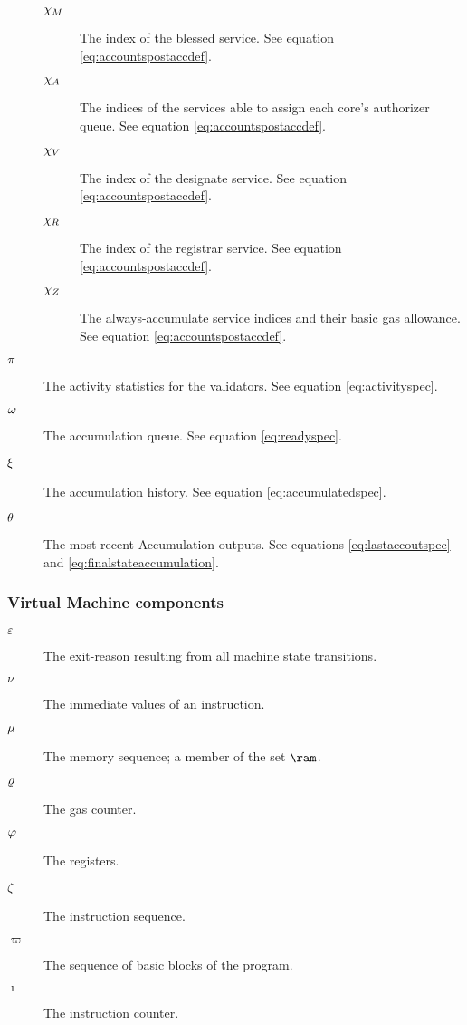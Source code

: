 \begin{description}
  \begin{description}
    \item[$\chi_M$] The index of the blessed service. See equation \ref{eq:accountspostaccdef}.
    \item[$\chi_A$] The indices of the services able to assign each core's authorizer queue. See equation \ref{eq:accountspostaccdef}.
    \item[$\chi_V$] The index of the designate service. See equation \ref{eq:accountspostaccdef}.
    \item[$\chi_R$] The index of the registrar service. See equation \ref{eq:accountspostaccdef}.
    \item[$\chi_Z$] The always-accumulate service indices and their basic gas allowance. See equation \ref{eq:accountspostaccdef}.
  \end{description}
  \item[$\pi$] The activity statistics for the validators. See equation \ref{eq:activityspec}.
  \item[$\omega$] The accumulation queue. See equation \ref{eq:readyspec}.
  \item[$\xi$] The accumulation history. See equation \ref{eq:accumulatedspec}.
  \item[$\theta$] The most recent Accumulation outputs. See equations \ref{eq:lastaccoutspec} and \ref{eq:finalstateaccumulation}.
\end{description}

\subsubsection{Virtual Machine components}

\begin{description}
  \item[$\varepsilon$] The exit-reason resulting from all machine state transitions.
  \item[$\nu$] The immediate values of an instruction.
  \item[$\mu$] The memory sequence; a member of the set $\ram$.
  \item[$\varrho$] The gas counter.
  \item[$\varphi$] The registers.
  \item[$\zeta$] The instruction sequence.
  \item[$\varpi$] The sequence of basic blocks of the program.
  \item[$\imath$] The instruction counter.
\end{description}


